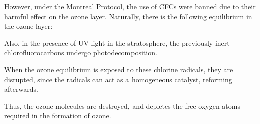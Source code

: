 		However, under the Montreal Protocol, the use of CFCs were banned due to their harmful effect on the ozone layer. Naturally, there
		is the following equilibrium in the ozone layer:



		Also, in the presence of UV light in the stratosphere, the previously inert chlorofluorocarbons undergo photodecomposition.


		When the ozone equilibrium is exposed to these chlorine radicals, they are disrupted, since the radicals can act as a
		homogeneous catalyst, reforming afterwards.


		Thus, the ozone molecules are destroyed, and depletes the free oxygen atoms required in the formation of ozone.












